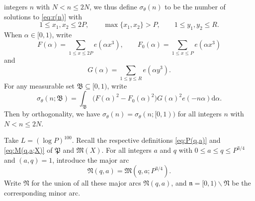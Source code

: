 \documentclass[12pt,english,reqno]{amsart}
\theoremstyle{definition}
\theoremstyle{remark}
\numberwithin{equation}{section}
\numberwithin{equation}{section}
\numberwithin{figure}{section}
\theoremstyle{plain}
\theoremstyle{plain}
\theoremstyle{plain}
\theoremstyle{plain}
\numberwithin{equation}{section}
\numberwithin{thm}{section}
\begin{document}
integers $ $$n$ with $N<n\leq2N$, we thus define $\sigma_{\theta}(n)$
to be the number of solutions to \eqref{eq:r(n)} with
\begin{equation}
1\leq x_{1},x_{2}\leq2P,\qquad\max\{x_{1},x_{2}\}>P,\qquad1\leq y_{1},y_{2}\leq R.\label{eq:parameters in asymptotic formula}\end{equation}
When $\alpha\in[0,1)$, write
\begin{equation}
F(\alpha)=\sum_{1\leq x\leq2P}e(\alpha x^{3}),\qquad F_{0}(\alpha)=\sum_{1\leq x\leq P}e(\alpha x^{3})\label{eq:F}\end{equation}
and 
\begin{equation}
G(\alpha)=\sum_{1\leq y\leq R}e(\alpha y^{3}).\label{eq:G}\end{equation}
For any measurable set $\mathfrak{B}\subseteq[0,1)$, write
\begin{equation}
\sigma_{\theta}(n;\mathfrak{B})=\int_{\mathfrak{B}}\Big(F(\alpha)^{2}-F_{0}(\alpha)^{2}\Big)G(\alpha)^{2}e(-n\alpha)\mathrm{d}\alpha.\label{eq:sigma(n,B)}\end{equation}
Then by orthogonality, we have $\sigma_{\theta}(n)=\sigma_{\theta}(n;[0,1))$
for all integers $n$ with $N<n\leq2N$.
\par Take $L=(\log P)^{100}.$ Recall the respective definitions \eqref{eq:P(q,a)}
and \eqref{eq:M(q,a;X)} of $\mathfrak{P}$ and $\mathfrak{M}(X)$.
For all integers $a$ and $q$ with $0\leq a\leq q\leq P^{3/4}$ and
$(a,q)=1$, introduce the major arc
\begin{equation}
\mathfrak{N}(q,a)=\mathfrak{M}(q,a;P^{3/4}).\label{eq:N(q,a)}\end{equation}
Write $\mathfrak{N}$ for the union of all these major arcs $\mathfrak{N}(q,a)$,
and $\mathfrak{n}=[0,1)\backslash\mathfrak{N}$ be the corresponding
minor arc.
\end{document}
